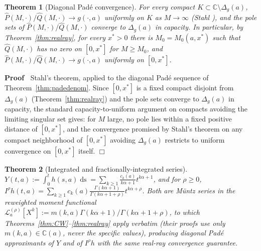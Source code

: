 \documentclass{article}
\newcommand{\assign}{:=}
\newcommand{\tmem}[1]{{\em #1\/}}
\newcommand{\tmop}[1]{\ensuremath{\operatorname{#1}}}
\newenvironment{proof}{\noindent\textbf{Proof\ }}{\hspace*{\fill}$\Box$\medskip}
\newtheorem{theorem}{Theorem}
\newcommand{\C}{\mathbb{C}}
\newcommand{\Lop}{\mathcal{L}}
\begin{document}
\begin{theorem}
  [Diagonal Pad{\'e} convergence]\label{thm:stahl} For every compact $K
  \subset \C \setminus \Delta_g (a)$, $\hat{P} (M, \cdot) / \hat{Q} (M,
  \cdot) \to g (\cdot, a)$ uniformly on $K$ as $M \to \infty$ {\tmem{(Stahl
  {\cite[Thm.~1, {\textsection}6]{Stahl}})}}, and the pole sets of $\hat{P}
  (M, \cdot) / \hat{Q} (M, \cdot)$ converge to $\Delta_g (a)$ in capacity. In
  particular, by Theorem~\ref{thm:realray}, for every $x^{\ast} > 0$ there is
  $M_0 = M_0 (a, x^{\ast})$ such that $\hat{Q} (M, \cdot)$ has no zero on $[0,
  x^{\ast}]$ for $M \ge M_0$, and $\hat{P} (M, \cdot) / \hat{Q} (M, \cdot) \to
  g (\cdot, a)$ uniformly on $[0, x^{\ast}]$.
\end{theorem}

\begin{proof}
  Stahl's theorem, applied to the diagonal Pad{\'e} sequence of
  Theorem~\ref{thm:padedenom}. Since $[0, x^{\ast}]$ is a fixed compact
  disjoint from $\Delta_g (a)$ (Theorem~\ref{thm:realray}) and the pole sets
  converge to $\Delta_g (a)$ in capacity, the standard capacity-to-uniform
  argument on compacts avoiding the limiting singular set gives: for $M$
  large, no pole lies within a fixed positive distance of $[0, x^{\ast}]$,
  and the convergence promised by Stahl's theorem on any compact
  neighborhood of $[0, x^{\ast}]$ avoiding $\Delta_g (a)$ restricts to
  uniform convergence on $[0, x^{\ast}]$ itself.
\end{proof}

\begin{theorem}
  [Integrated and fractionally-integrated series]\label{thm:integ} $Y (t, a)
  \assign \int_0^t h (s, a)  \tmop{ds} = \sum_{k \ge 1} \frac{c_k (a)}{k
  \alpha + 1} t^{k \alpha + 1}$, and for $\rho \ge 0$, $I^{\rho} h (t, a) =
  \sum_{k \ge 1} c_k (a)  \frac{\Gamma (k \alpha + 1)}{\Gamma (k \alpha + 1 +
  \rho)} t^{k \alpha + \rho}$. Both are M{\"u}ntz series in the reweighted
  moment functional $\Lop_a^{(\rho)} [X^k] \assign m (k, a)  \Gamma (k \alpha
  + 1) / \Gamma (k \alpha + 1 + \rho)$, to which
  Theorems~\ref{thm:CW}--\ref{thm:realray} apply verbatim (their proofs use
  only $m (k, a) \in \C (a)$, never the specific values), producing diagonal
  Pad{\'e} approximants of $Y$ and of $I^{\rho} h$ with the same
  real-ray convergence guarantee.
\end{theorem}
\end{document}
